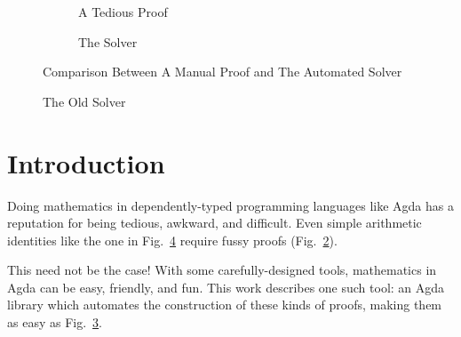 \documentclass[acmsmall,review,anonymous]{acmart}\settopmatter{printfolios=true,printccs=false,printacmref=false}
\begin{document}
\begin{figure}[h]
  \begin{subfigure}[b]{\linewidth}
    \centering
    \label{ring-lemma}
  \end{subfigure}
  \begin{subfigure}[b]{.5\linewidth}
    \caption{A Tedious Proof}
    \label{ring-proof}
  \end{subfigure}%
  \begin{subfigure}[b]{.3\linewidth}
    \centering
    \caption{The Solver}
    \label{the-solver}
  \end{subfigure}
  \caption{Comparison Between A Manual Proof and The Automated Solver}
  \label{comparison}
\end{figure}

\begin{figure}
  \caption{The Old Solver}
  \label{old-solver}
\end{figure}
\section{Introduction}
Doing mathematics in dependently-typed programming languages like Agda has a
reputation for being tedious, awkward, and difficult. Even simple arithmetic
identities like the one in Fig.~\ref{comparison} require fussy proofs
(Fig.~\ref{ring-proof}).

This need not be the case! With some carefully-designed tools, mathematics in
Agda can be easy, friendly, and fun. This work describes one such tool: an
Agda library which automates the construction of these kinds of proofs, making
them as easy as Fig.~\ref{the-solver}.
\end{document}

